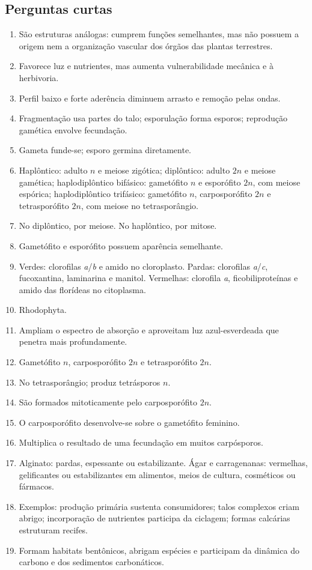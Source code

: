 \documentclass[12pt,a4paper]{article}
\newcommand{\n}{\ensuremath{n}}
\newcommand{\dn}{\ensuremath{2n}}
\begin{document}
\subsection{Perguntas curtas}
\begin{enumerate}
\item São estruturas análogas: cumprem funções semelhantes, mas não possuem a
origem nem a organização vascular dos órgãos das plantas terrestres.
\item Favorece luz e nutrientes, mas aumenta vulnerabilidade mecânica e à
herbivoria.
\item Perfil baixo e forte aderência diminuem arrasto e remoção pelas ondas.
\item Fragmentação usa partes do talo; esporulação forma esporos; reprodução
gamética envolve fecundação.
\item Gameta funde-se; esporo germina diretamente.
\item Haplôntico: adulto \n{} e meiose zigótica; diplôntico: adulto \dn{} e
meiose gamética; haplodiplôntico bifásico: gametófito \n{} e esporófito \dn{},
com meiose espórica; haplodiplôntico trifásico: gametófito \n{},
carposporófito \dn{} e tetrasporófito \dn{}, com meiose no tetrasporângio.
\item No diplôntico, por meiose. No haplôntico, por mitose.
\item Gametófito e esporófito possuem aparência semelhante.
\item Verdes: clorofilas \textit{a}/\textit{b} e amido no cloroplasto. Pardas:
clorofilas \textit{a}/\textit{c}, fucoxantina, laminarina e manitol.
Vermelhas: clorofila \textit{a}, ficobiliproteínas e amido das florídeas no
citoplasma.
\item Rhodophyta.
\item Ampliam o espectro de absorção e aproveitam luz azul-esverdeada que
penetra mais profundamente.
\item Gametófito \n, carposporófito \dn{} e tetrasporófito \dn.
\item No tetrasporângio; produz tetrásporos \n.
\item São formados mitoticamente pelo carposporófito \dn.
\item O carposporófito desenvolve-se sobre o gametófito feminino.
\item Multiplica o resultado de uma fecundação em muitos carpósporos.
\item Alginato: pardas, espessante ou estabilizante. Ágar e carragenanas:
vermelhas, gelificantes ou estabilizantes em alimentos, meios de cultura,
cosméticos ou fármacos.
\item Exemplos: produção primária sustenta consumidores; talos complexos criam
abrigo; incorporação de nutrientes participa da ciclagem; formas calcárias
estruturam recifes.
\item Formam habitats bentônicos, abrigam espécies e participam da dinâmica do
carbono e dos sedimentos carbonáticos.
\end{enumerate}
\end{document}
